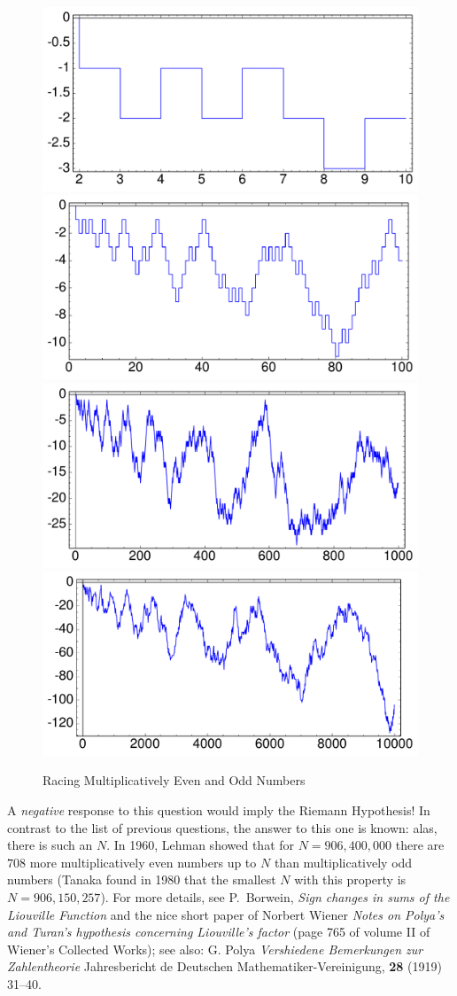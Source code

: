 \documentclass[11pt]{article}
\theoremstyle{plain}
\theoremstyle{definition}
\numberwithin{equation}{section}
\numberwithin{figure}{section}
\numberwithin{table}{section}
\begin{document}
 \begin{figure}[htbp]
\begin{center}
\includegraphics[width=.4\textwidth]{illustrations/liouville-10}
\includegraphics[width=.4\textwidth]{illustrations/liouville-100}\\
\includegraphics[width=.4\textwidth]{illustrations/liouville-1000}
\includegraphics[width=.4\textwidth]{illustrations/liouville-10000}\\
\caption{Racing Multiplicatively Even and Odd Numbers\label{fig:liouville}}
\end{center}
\end{figure}
  
A {\em negative} response to this question would imply the Riemann
Hypothesis!  In contrast to the list of previous questions, the answer
to this one is known: alas, there is such an $N$.  In 1960, Lehman
showed that for $N=906,400,000$ there are $708$ more multiplicatively
even numbers up to $N$ than multiplicatively odd numbers (Tanaka found
in 1980 that the smallest $N$ with this property is
$N=906,150,257$). For more details, see P.~Borwein, {\em Sign changes
  in sums of the Liouville Function} and the nice short paper of
Norbert Wiener {\em Notes on Polya's and Turan's hypothesis concerning
  Liouville's factor} (page 765 of volume II of Wiener's Collected
Works); see also: G. Polya {\em Vershiedene Bemerkungen zur
  Zahlentheorie} Jahresbericht de Deutschen Mathematiker-Vereinigung,
{\bf 28} (1919) 31--40.
\end{document}
